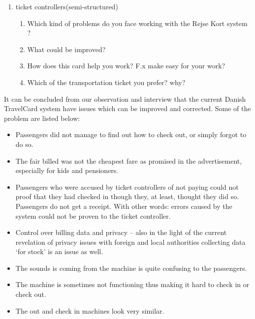 \begin{enumerate}
		\item ticket controllers(semi-structured)
		\begin{enumerate}
			\item Which kind of problems do you face working with the Rejse Kort system ?
			\item What could be improved?
			\item How does this card help you work? F.x make easy for your work?
			\item Which of the transportation ticket you prefer? why?
		\end{enumerate}

\end{enumerate}

It can be concluded from our observation and interview that the current Danish TravelCard system have issues which can be improved and corrected. Some of the problem are listed below:

\begin{itemize}%
  \renewcommand{\labelitemi}{$\Rightarrow$}
 	\item Passengers did not manage to find out how to check out, or simply forgot to do so.
 	\item The fair billed was not the cheapest fare as promised in the advertisement, especially for kids and pensioners.
	\item Passengers who were accused by ticket controllers of not paying could not proof that they had checked in though they, at least, thought they did so. Passengers do not get a receipt. With other words: errors caused by the system could not be proven to the ticket controller.
	\item Control over billing data and privacy – also in the light of the current revelation of privacy issues with foreign and local authorities collecting data ‘for stock’ is an issue as well.
	\item The sounds is coming from the machine is quite confusing to the passengers.
	\item The machine is sometimes not functioning thus making it hard to check in or check out.
	\item The out and check in machines look very similar.
\end{itemize}
